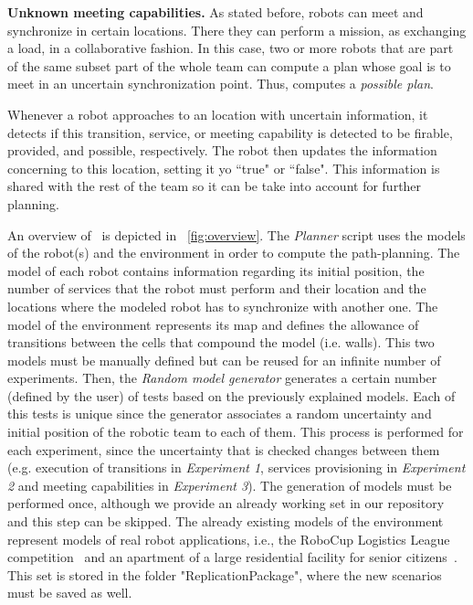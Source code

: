 \textbf{Unknown meeting capabilities.} 
As stated before, robots can meet and synchronize in certain locations.
There they can perform a mission, as exchanging a load, in a collaborative fashion.
In this case, two or more robots that are part of the same subset part of the whole team can compute a plan whose goal is to meet in an uncertain synchronization point.
Thus, \toolName computes a \emph{possible plan}.

Whenever a robot approaches to an location with uncertain information, it detects if this transition, service, or meeting capability is detected to be firable, provided, and possible, respectively.
The robot then updates the information concerning to this location, setting it yo ``true" or ``false".
This information is shared with the rest of the team so it can be take into account for further planning.

An overview of \toolName\ is depicted in ~\ref{fig:overview}.
The \emph{Planner} script uses the models of the robot(s) and the environment in order to compute the path-planning.
The model of each robot contains information regarding its initial position, the number of services that the robot must perform and their location and the locations where the modeled robot has to synchronize with another one.  
The model of the environment represents its map and defines the allowance of transitions between the cells that compound the model (i.e. walls). 
This two models must be manually defined but can be reused for an infinite number of experiments.
Then, the \emph{Random model generator} generates a certain number (defined by the user) of tests based on the previously explained models.
Each of this tests is unique since the generator associates a random uncertainty and initial position of the robotic team to each of them.
This process is performed for each experiment, since the uncertainty that is checked changes between them (e.g. execution of transitions in \emph{Experiment 1}, services provisioning in \emph{Experiment 2} and meeting capabilities in \emph{Experiment 3}).
The generation of models must be performed once, although we provide an already working set in our repository and this step can be skipped.
The already existing models of the environment represent models of real robot applications, i.e., the RoboCup Logistics League competition~\cite{karrasrobocup} and an apartment of a large residential facility for senior citizens~\cite{map}.
This set is stored in the folder "ReplicationPackage", where the new scenarios must be saved as well.


